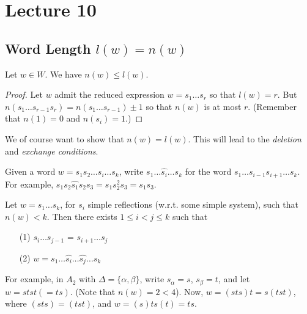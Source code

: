 \section{Lecture 10}

\subsection{Word Length $l(w) = n(w)$}

\begin{lemma} \label{lem9}
Let $w \in W$. We have $n(w) \leq l(w)$.
\end{lemma}

\begin{proof}
Let $w$ admit the reduced expression $w = s_1 \dots s_r$ so that $l(w) = r$.
But $n(s_1 \dots s_{r-1} s_r) = n(s_1 \dots s_{r-1}) \pm 1$ so that $n(w)$ is
at most $r$. (Remember that $n(1) = 0$ and $n(s_i) = 1$.)
\end{proof}

We of course want to show that $n(w) = l(w)$. This will lead to the {\em deletion}
and {\em exchange conditions}.

Given a word $w = s_1 s_2 \dots s_i \dots s_k$, write
$
    s_1 \dots \hat{s_i} \dots s_k
$
for the word $s_1 \dots s_{i-1} s_{i+1} \dots s_k$. For example,
$
    s_1 s_2 \hat{s_1} s_2 s_3 = s_1 s_2^2 s_3 = s_1 s_3.
$

\begin{theorem} \label{thm10}
Let $w = s_1 \dots s_k$, for $s_i$ simple reflections (w.r.t. some simple
system), such that $n(w) < k$. Then there exists $1 \leq i < j \leq k$ such that
\begin{enumerate}
\item[(1)] $s_i \dots s_{j-1}$ = $s_{i+1} \dots s_{j}$
\item[(2)] $w = s_1 \dots \hat{s_i} \dots \hat{s_j} \dots s_k$
\end{enumerate}
\end{theorem}

For example, in $A_2$ with $\Delta = \{\alpha, \beta\}$, write $s_\alpha = s$,
$s_\beta = t$, and let $w = stst (= ts)$.
(Note that $n(w) = 2 < 4$). Now,
$w = (sts)t = s(tst)$,
where $(sts) = (tst)$, and
$w = (s)ts(t) = ts$.

